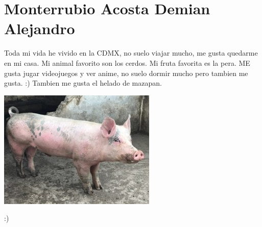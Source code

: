 \chapter{Monterrubio Acosta Demian Alejandro}
Toda mi vida he vivido en la CDMX, no suelo viajar mucho, me gusta quedarme en mi casa.
Mi animal favorito son los cerdos.
Mi fruta favorita es la pera.
ME gusta jugar videojuegos y ver anime, no suelo dormir mucho pero tambien me gusta.
:)
Tambien me gusta el helado de mazapan.

\includegraphics{./317529180/puerco.jpg}

:)
